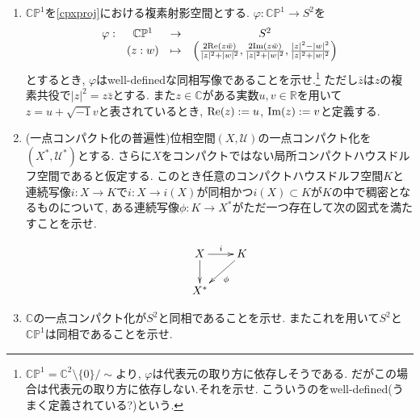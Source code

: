 \documentclass[dvipdfmx,a4paper,11pt]{article}
\newcommand{\R}{\mathbb{R}}
\newcommand{\C}{\mathbb{C}}
\theoremstyle{definition}
\begin{document}
\begin{enumerate}[label=\textbf{問}\ref*{sec-compact}.\arabic*]
\item $\C\mathbb{P}^1$を\ref{cpxproj}における複素射影空間とする. $\varphi: \C\mathbb{P}^1  \rightarrow S^2$を
$$
      \begin{matrix}
     \varphi: &\C\mathbb{P}^1 & \rightarrow &S^2\\
      &(z: w)& \mapsto& \left(\frac{2{\rm Re}(z\bar{w})}{|z|^2 + |w|^2}, \frac{2{\rm Im}(z\bar{w})}{|z|^2 + |w|^2}, \frac{|z|^2 - |w|^2}{|z|^2 + |w|^2}\right)
       \end{matrix}
      $$
とするとき, $\varphi$はwell-definedな同相写像であることを示せ.\footnote{$\C\mathbb{P}^1 = \C^2 \setminus \{0\} /\sim $より, $\varphi$は代表元の取り方に依存しそうである. だがこの場合は代表元の取り方に依存しない.それを示せ. こういうのをwell-defined(うまく定義されている?)という.}
ただし$\bar{z}$は$z$の複素共役で$|z|^2 = z \bar{z}$とする. また$z \in \C$がある実数$u,v \in \R$を用いて$z = u + \sqrt{-1}v$と表されているとき, ${\rm Re}(z) := u$, ${\rm Im}(z) := v$と定義する. 

\item (一点コンパクト化の普遍性)位相空間$(X, \mathscr{U})$の一点コンパクト化を$(X^{*}, \mathscr{U}^{*})$とする. 
さらに$X$をコンパクトではない局所コンパクトハウスドルフ空間であると仮定する.
このとき任意のコンパクトハウスドルフ空間$K$と連続写像$i : X \rightarrow K$で$i : X \rightarrow i(X)$が同相かつ$i(X) \subset K$が$K$の中で稠密となるものについて, ある連続写像$\phi : K \rightarrow X^{*}$がただ一つ存在して次の図式を満たすことを示せ.

\vspace{-22pt}
  \begin{equation*}
\xymatrix@C=20pt@R=20pt{
X\ar@{->}[d]  \ar@{->}[r]^{i} & K\ar@{->}[ld]^{\phi}  \\
X^{*} & 
 }
\end{equation*}
\item $\C$の一点コンパクト化が$S^2$と同相であることを示せ. またこれを用いて$S^2$と$\C\mathbb{P}^1$は同相であることを示せ.




\end{enumerate}
\end{document}
